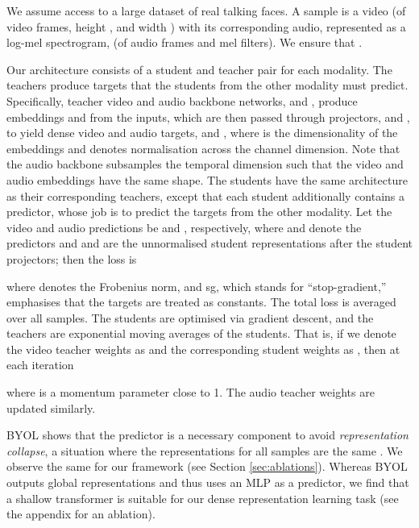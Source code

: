 \documentclass[10pt,twocolumn,letterpaper]{article}
\begin{document}
\begin{description}[wide,itemindent=\labelsep]

\item[Formulation.] We assume access to a large dataset  of real talking faces. A sample  is a video  (of  video frames, height , and width ) with its corresponding audio, represented as a log-mel spectrogram,  (of  audio frames and  mel filters). We ensure that .

Our architecture consists of a student and teacher pair for each modality. The teachers produce targets that the students from the other modality must predict. Specifically, teacher video and audio backbone networks,  and , produce embeddings  and  from the inputs, which are then passed through projectors,  and , to yield dense video and audio targets,  and , where  is the dimensionality of the embeddings and  denotes  normalisation across the channel dimension. Note that the audio backbone subsamples the temporal dimension such that the video and audio embeddings have the same shape. The students have the same architecture as their corresponding teachers, except that each student additionally contains a predictor, whose job is to predict the targets from the other modality. Let the video and audio predictions be  and , respectively, where  and  denote the predictors and  and  are the unnormalised student representations after the student projectors; then the loss is

where  denotes the Frobenius norm, and sg, which stands for ``stop-gradient,'' emphasises that the targets are treated as constants. The total loss is averaged over all samples. The students are optimised via gradient descent, and the teachers are exponential moving averages of the students. That is, if we denote the video teacher weights as  and the corresponding student weights as , then at each iteration

where  is a momentum parameter close to 1. The audio teacher weights are updated similarly.

\item[Transformer as predictor.] BYOL shows that the predictor is a necessary component to avoid \textit{representation collapse}, a situation where the representations for all samples are the same \cite{grill2020bootstrap}. We observe the same for our framework (see Section \ref{sec:ablations}). Whereas BYOL outputs global representations and thus uses an MLP as a predictor, we find that a shallow transformer is suitable for our dense representation learning task (see the appendix for an ablation).  


\end{description}
\end{document}
